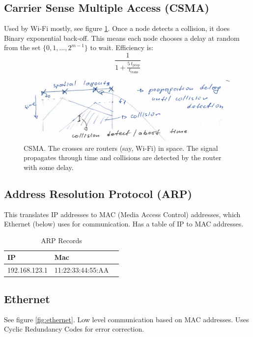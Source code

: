 \documentclass{article}
\begin{document}
\subsection{Carrier Sense Multiple Access (CSMA)}
Used by Wi-Fi mostly, see figure \ref{fig:csma}. Once a node detects a collision, it does Binary exponential back-off. This means each node chooses a delay at random from the set $\{ 0, 1, ..., 2^{m - 1}\}$ to wait. Efficiency is:
\begin{equation}
    \frac{1}{1 + \frac{5\ t_{\text{prop}}}{t_{\text{trans}}}}
\end{equation}

\begin{figure}
    \centering
    \includegraphics[width=1\textwidth]{figures/csma.png}
    \caption{CSMA. The crosses are routers (say, Wi-Fi) in space. The signal propagates through time and collisions are detected by the router with some delay.}
    \label{fig:csma}
\end{figure}

\subsection{Address Resolution Protocol (ARP)}
This translates IP addresses to MAC (Media Access Control) addresses, which Ethernet (below) uses for communication. Has a table of IP to MAC addresses.

\begin{table}[h]
    \centering
    \begin{tabular}{ lll }
        IP & Mac \\
        \hline
        192.168.123.1 & 11:22:33:44:55:AA \\
    \end{tabular}
    \caption{ARP Records}
    \label{tab:dns}
\end{table}

\subsection{Ethernet}
See figure \ref{fig:ethernet}. Low level communication based on MAC addresses. Uses Cyclic Redundancy Codes for error correction.
\end{document}
